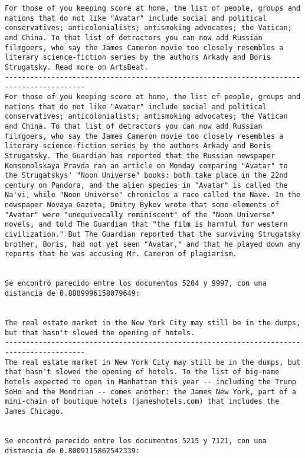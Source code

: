 \documentclass[11pt]{article}
\begin{document}
\begin{Verbatim}[commandchars=\\\{\}]
For those of you keeping score at home, the list of people, groups and nations that do not like "Avatar" include social and political conservatives; anticolonialists; antismoking advocates; the Vatican; and China. To that list of detractors you can now add Russian filmgoers, who say the James Cameron movie too closely resembles a literary science-fiction series by the authors Arkady and Boris Strugatsky. Read more on ArtsBeat.
-----------------------------------------------------------------------------------------
For those of you keeping score at home, the list of people, groups and nations that do not like "Avatar" include social and political conservatives; anticolonialists; antismoking advocates; the Vatican and China. To that list of detractors you can now add Russian filmgoers, who say the James Cameron movie too closely resembles a literary science-fiction series by the authors Arkady and Boris Strugatsky. The Guardian has reported that the Russian newspaper Komsomolskaya Pravda ran an article on Monday comparing "Avatar" to the Strugatskys' "Noon Universe" books: both take place in the 22nd century on Pandora, and the alien species in "Avatar" is called the Na'vi, while "Noon Universe" chronicles a race called the Nave. In the newspaper Novaya Gazeta, Dmitry Bykov wrote that some elements of "Avatar" were "unequivocally reminiscent" of the "Noon Universe" novels, and told The Guardian that "the film is harmful for western civilization." But The Guardian reported that the surviving Strugatsky brother, Boris, had not yet seen "Avatar," and that he played down any reports that he was accusing Mr. Cameron of plagiarism.


Se encontró parecido entre los documentos 5204 y 9997, con una distancia de 0.8889996158079649:


The real estate market in the New York City may still be in the dumps, but that hasn't slowed the opening of hotels.
-----------------------------------------------------------------------------------------
The real estate market in New York City may still be in the dumps, but that hasn't slowed the opening of hotels. To the list of big-name hotels expected to open in Manhattan this year -- including the Trump SoHo and the Mondrian -- comes another: the James New York, part of a mini-chain of boutique hotels (jameshotels.com) that includes the James Chicago.


Se encontró parecido entre los documentos 5215 y 7121, con una distancia de 0.8009115862542339:



\end{Verbatim}
\end{document}

